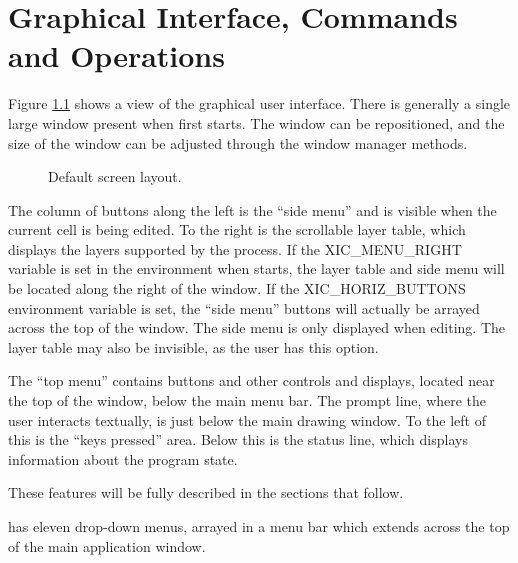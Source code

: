 
\chapter{Graphical Interface, Commands and Operations}

Figure \ref{screenfig} shows a view of the {\Xic} graphical user
interface.  There is generally a single large window present when
{\Xic} first starts.  The window can be repositioned, and the size of
the window can be adjusted through the window manager methods.

\begin{figure}
\caption{\label{screenfig}Default {\Xic} screen layout.}
\begin{center}
\end{center}
\end{figure}

The column of buttons along the left is the ``side menu'' and is
visible when the current cell is being edited.  To the right is the
scrollable layer table, which displays the layers supported by the
process.  If the {\et XIC\_MENU\_RIGHT} variable is set in the
environment when {\Xic} starts, the layer table and side menu will be
located along the right of the window.  If the {\et
XIC\_HORIZ\_BUTTONS} environment variable is set, the ``side menu''
buttons will actually be arrayed across the top of the window.
The side menu is only displayed when editing.  The layer table may
also be invisible, as the user has this option.

The ``top menu'' contains buttons and other controls and displays,
located near the top of the window, below the main menu bar.  The
prompt line, where the user interacts textually, is just below the
main drawing window.  To the left of this is the ``keys pressed''
area.  Below this is the status line, which displays information about
the program state.

These features will be fully described in the sections that follow.

{\Xic} has eleven drop-down menus, arrayed in a menu bar which
extends across the top of the main application window.

